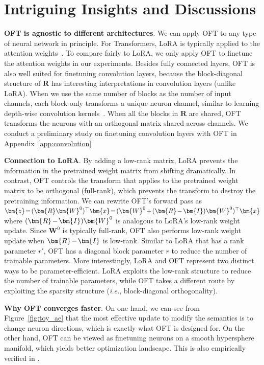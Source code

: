 \section{Intriguing Insights and Discussions}

\textbf{OFT is agnostic to different architectures}. We can apply OFT to any type of neural network in principle. For Transformers, LoRA is typically applied to the attention weights~\cite{hulora2022}. To compare fairly to LoRA, we only apply OFT to finetune the attention weights in our experiments. Besides fully connected layers, OFT is also well suited for finetuning convolution layers, because the block-diagonal structure of $\bm{R}$ has interesting interpretations in convolution layers (unlike LoRA). When we use the same number of blocks as the number of input channels, each block only transforms a unique neuron channel, similar to learning depth-wise convolution kernels~\cite{chollet2017xception}. When all the blocks in $\bm{R}$ are shared, OFT transforms the neurons with an orthogonal matrix shared across channels. We conduct a preliminary study on finetuning convolution layers with OFT in Appendix~\ref{app:convolution}

\textbf{Connection to LoRA}. By adding a low-rank matrix, LoRA prevents the information in the pretrained weight matrix from shifting dramatically. In contrast, OFT controls the transform that applies to the pretrained weight matrix to be orthogonal (full-rank), which prevents the transform to destroy the pretraining information. We can rewrite OFT's forward pass as $\thickmuskip=2mu \medmuskip=2mu \bm{z}=(\bm{R}\bm{W}^0)^\top\bm{x}=(\bm{W}^0+(\bm{R}-\bm{I})\bm{W}^0)^\top\bm{x}$ where $\thickmuskip=2mu \medmuskip=2mu (\bm{R}-\bm{I})\bm{W}^0$ is analogous to LoRA's low-rank weight update. Since $\bm{W}^0$ is typically full-rank, OFT also performs low-rank weight update when $\thickmuskip=2mu \medmuskip=2mu \bm{R}-\bm{I}$ is low-rank. Similar to LoRA that has a rank parameter $r'$, OFT has a diagonal block parameter $r$ to reduce the number of trainable parameters. More interestingly, LoRA and OFT represent two distinct ways to be parameter-efficient. LoRA exploits the low-rank structure to reduce the number of trainable parameters, while OFT takes a different route by exploiting the sparsity structure (\emph{i.e.}, block-diagonal orthogonality).

\textbf{Why OFT converges faster}. On one hand, we can see from Figure~\ref{fig:toy_ae} that the most effective update to modify the semantics is to change neuron directions, which is exactly what OFT is designed for. On the other hand, OFT can be viewed as finetuning neurons on a smooth hypersphere manifold, which yields better optimization landscape. This is also empirically verified in \cite{liu2021orthogonal}.

